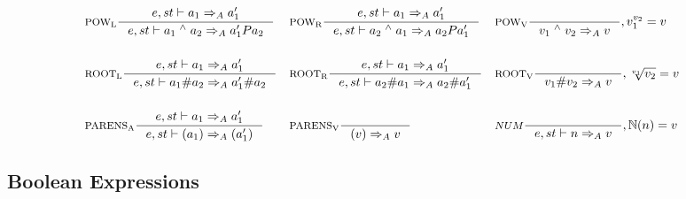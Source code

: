 \begin{align*}
\\\\
&\inference[$\text{POW}_\text{L}$]{e,st \vdash a_1  \Rightarrow_A a_1'}
                    {e,st \vdash a_1 \; ^\wedge{} \; a_2 \Rightarrow_A a_1' P a_2}
&
&\inference[$\text{POW}_\text{R}$]{e,st \vdash a_1 \Rightarrow_A a_1'}
                    {e,st \vdash a_2 \; ^\wedge{} \; a_1 \Rightarrow_A a_2 P a_1'}
&
&\inference[$\text{POW}_\text{V}$]{}
                    {v_1 \; ^\wedge{} \; v_2 \Rightarrow_A v}
										{, v_1 ^ {v_2} = v}
\\\\
&\inference[$\text{ROOT}_\text{L}$]{e,st \vdash a_1 \Rightarrow_A a_1'}
                    {e,st \vdash a_1 \# a_2 \Rightarrow_A a_1' \# a_2}
&
&\inference[$\text{ROOT}_\text{R}$]{e,st \vdash a_1 \Rightarrow_A a_1'}
                    {e,st \vdash a_2 \# a_1 \Rightarrow_A a_2 \# a_1'}
&
&\inference[$\text{ROOT}_\text{V}$]{}
                    {v_1 \# v_2 \Rightarrow_A v}
										{, \sqrt[v_1]{v_2} = v}
\\\\
&\inference[$\text{PARENS}_\text{A}$]{e,st \vdash a_1 \Rightarrow_A a_1'}
                       {e,st \vdash (a_1) \Rightarrow_A (a_1')}
&
&\inference[$\text{PARENS}_\text{V}$]{}
                       {(v) \Rightarrow_A v}
&
&\inference[$NUM$]{}
                  {e,st \vdash n \Rightarrow_A v}
									{, \mathbb{N}(n) = v}
\end{align*}

\subsection{Boolean Expressions}
\newcommand{\Tand}{\mathbin{\text{AND}}}
\newcommand{\Tnot}{\mathbin{\text{NOT}}}
\newcommand{\Tnand}{\mathbin{\text{NAND}}}
\newcommand{\Tor}{\mathbin{\text{OR}}}
\newcommand{\Tnor}{\mathbin{\text{NOR}}}
\newcommand{\Txor}{\mathbin{\text{XOR}}}

